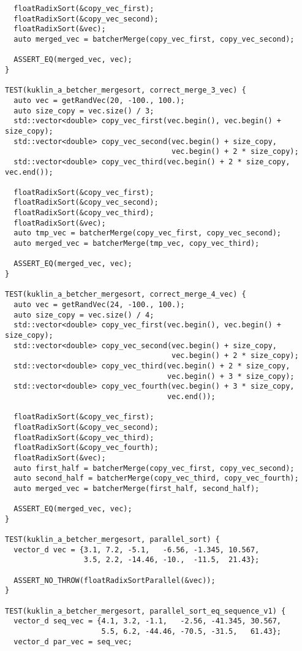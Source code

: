 \documentclass{report}
\begin{document}
\begin{lstlisting}
  floatRadixSort(&copy_vec_first);
  floatRadixSort(&copy_vec_second);
  floatRadixSort(&vec);
  auto merged_vec = batcherMerge(copy_vec_first, copy_vec_second);

  ASSERT_EQ(merged_vec, vec);
}

TEST(kuklin_a_betcher_mergesort, correct_merge_3_vec) {
  auto vec = getRandVec(20, -100., 100.);
  auto size_copy = vec.size() / 3;
  std::vector<double> copy_vec_first(vec.begin(), vec.begin() + size_copy);
  std::vector<double> copy_vec_second(vec.begin() + size_copy,
                                      vec.begin() + 2 * size_copy);
  std::vector<double> copy_vec_third(vec.begin() + 2 * size_copy, vec.end());

  floatRadixSort(&copy_vec_first);
  floatRadixSort(&copy_vec_second);
  floatRadixSort(&copy_vec_third);
  floatRadixSort(&vec);
  auto tmp_vec = batcherMerge(copy_vec_first, copy_vec_second);
  auto merged_vec = batcherMerge(tmp_vec, copy_vec_third);

  ASSERT_EQ(merged_vec, vec);
}

TEST(kuklin_a_betcher_mergesort, correct_merge_4_vec) {
  auto vec = getRandVec(24, -100., 100.);
  auto size_copy = vec.size() / 4;
  std::vector<double> copy_vec_first(vec.begin(), vec.begin() + size_copy);
  std::vector<double> copy_vec_second(vec.begin() + size_copy,
                                      vec.begin() + 2 * size_copy);
  std::vector<double> copy_vec_third(vec.begin() + 2 * size_copy,
                                     vec.begin() + 3 * size_copy);
  std::vector<double> copy_vec_fourth(vec.begin() + 3 * size_copy,
                                     vec.end());

  floatRadixSort(&copy_vec_first);
  floatRadixSort(&copy_vec_second);
  floatRadixSort(&copy_vec_third);
  floatRadixSort(&copy_vec_fourth);
  floatRadixSort(&vec);
  auto first_half = batcherMerge(copy_vec_first, copy_vec_second);
  auto second_half = batcherMerge(copy_vec_third, copy_vec_fourth);
  auto merged_vec = batcherMerge(first_half, second_half);

  ASSERT_EQ(merged_vec, vec);
}

TEST(kuklin_a_betcher_mergesort, parallel_sort) {
  vector_d vec = {3.1, 7.2, -5.1,   -6.56, -1.345, 10.567,
                  3.5, 2.2, -14.46, -10.,  -11.5,  21.43};

  ASSERT_NO_THROW(floatRadixSortParallel(&vec));
}

TEST(kuklin_a_betcher_mergesort, parallel_sort_eq_sequence_v1) {
  vector_d seq_vec = {4.1, 3.2, -1.1,   -2.56, -41.345, 30.567,
                      5.5, 6.2, -44.46, -70.5, -31.5,   61.43};
  vector_d par_vec = seq_vec;


\end{lstlisting}
\end{document}
